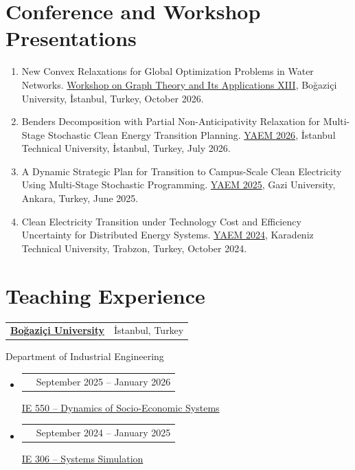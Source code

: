 \documentclass[a4paper,11pt]{article}
\makeatletter
\newcommand{\cvsection}[1]{\Needspace{4\baselineskip}\section*{#1}}
\newcommand{\cvline}[2]{%
  \begin{tabularx}{\linewidth}[t]{@{}>{\raggedright\arraybackslash}X r@{}}%
    #1 & #2 \\
  \end{tabularx}\par
}
\newcommand{\cvheading}[2]{\Needspace{3\baselineskip}\cvline{#1}{#2}}
\makeatother
\begin{document}
\newpage

\cvsection{Conference and Workshop Presentations}

\begin{enumerate}[itemsep=6pt]
  \item New Convex Relaxations for Global Optimization Problems in Water Networks.
  \href{https://bilmuh.gtu.edu.tr/~dgozupek/wgt2026/}{Workshop on Graph Theory and Its Applications XIII},
  Boğaziçi University, İstanbul, Turkey, October 2026.

  \item 
  Benders Decomposition with Partial Non-Anticipativity Relaxation for Multi-Stage Stochastic Clean Energy Transition Planning.
  \href{https://www.yad.org.tr/tr/yaem/kongreler/}{YAEM 2026}, İstanbul Technical University, İstanbul, Turkey, July 2026.

  \item 
  A Dynamic Strategic Plan for Transition to Campus-Scale Clean Electricity Using Multi-Stage Stochastic Programming.
  \href{https://www.yad.org.tr/tr/yaem/kongreler/}{YAEM 2025}, Gazi University, Ankara, Turkey, June 2025.

  \item Clean Electricity Transition under Technology Cost and Efficiency Uncertainty for Distributed Energy Systems.
  \href{https://www.yad.org.tr/tr/yaem/kongreler/}{YAEM 2024}, Karadeniz Technical University, Trabzon, Turkey, October 2024.
\end{enumerate}




\cvsection{Teaching Experience}

\cvheading{\textbf{\href{https://bogazici.edu.tr/}{Boğaziçi University}}}{İstanbul, Turkey}
Department of Industrial Engineering\par

\begin{itemize}[itemsep=3pt]
  \item \cvheading{{Graduate Teaching Assistant}}{September 2025 -- January 2026}

\href{https://ie.bogazici.edu.tr/courses/ie-550\%C2\%A0dynamics-socio-economic-systems}{IE 550 -- Dynamics of Socio-Economic Systems}\par

  \item \cvheading{{Undergraduate Teaching Assistant}}{September 2024 -- January 2025}

\href{https://ie.bogazici.edu.tr/courses/ie-306-systems-simulation}{IE 306 -- Systems Simulation}\par

\end{itemize}
\end{document}

